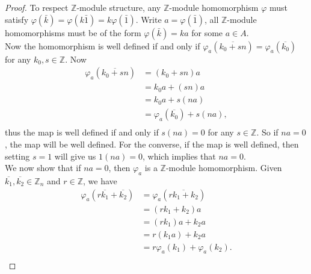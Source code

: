 \documentclass{article}
\begin{document}
  \begin{proof}
    To respect $\mathbb{Z}$-module structure, any $\mathbb{Z}$-module
    homomorphism $\varphi$ must satisfy $\varphi(\bar{k})
    =\varphi(k\bar{1}) =k\varphi(\bar{1})$. Write $a=\varphi(\bar{1})$, all
    $\mathbb{Z}$-module homomorphisms must be of the form
    $\varphi(\bar{k})=ka$ for some $a\in A$. \\

    Now the homomorphism is well defined if and only if
    $\varphi_a(\overline{k_0+sn})=\varphi_a(\overline{k_0})$ for any
    $k_0,s\in\mathbb{Z}$. Now
    \begin{align*}
      \varphi_a(\overline{k_0+sn}) &=(k_0+sn)a \\
      &=k_0a+(sn)a \\
      &=k_0a+s(na) \\
      &=\varphi_a(\overline{k_0})+s(na), \\
    \end{align*}
    thus the map is well defined if and only if $s(na)=0$ for any
    $s\in\mathbb{Z}$. So if $na=0$, the map will be well defined.
    For the converse, if the map is well defined, then setting $s=1$ will
    give us $1(na)=0$, which implies that $na=0$. \\

    We now show that if $na=0$, then $\varphi_a$ is a
    $\mathbb{Z}$-module homomorphism. Given
    $\overline{k_1},\overline{k_2}\in\mathbb{Z}_n$ and $r\in\mathbb{Z}$, we
    have
    \begin{align*}
      \varphi_a(r\overline{k_1}+\overline{k_2})
        &=\varphi_a(\overline{rk_1+k_2}) \\
      &=(rk_1+k_2)a \\
      &=(rk_1)a+k_2a \\
      &=r(k_1a)+k_2a \\
      &=r\varphi_a(k_1)+\varphi_a(k_2). \\
    \end{align*}


\end{proof}
\end{document}
